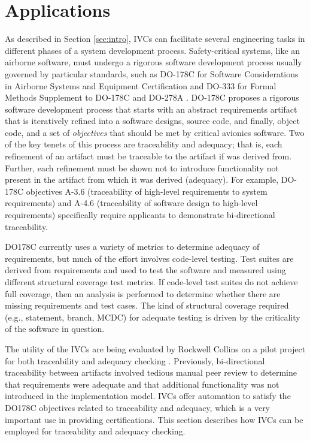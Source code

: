 \section{Applications}
\label{sec:apps}
As described in Section \ref{sec:intro}, IVCs can facilitate several engineering tasks in different phases of a system development process. 
Safety-critical systems, like an airborne software, must undergo a rigorous software development process usually governed by particular standards, such as DO-178C for Software Considerations in Airborne Systems and Equipment Certification \cite{DO178C} and DO-333 for Formal Methods Supplement to DO-178C and DO-278A \cite{DO333}. 
DO-178C proposes a rigorous software development process that starts with an abstract requirements artifact that is iteratively refined into a software designs, source code, and finally, object code, and a set of {\em objectives} that should be met by critical avionics software.  Two of the key tenets of this process are traceability and adequacy; that is, each refinement of an artifact must be traceable to the artifact if was derived from. Further, each refinement must be shown not to introduce functionality not present in the artifact from which it was derived (adequacy). For example, DO-178C objectives A-3.6 (traceability of high-level requirements to system requirements) and A-4.6 (traceability of software design to high-level requirements) specifically require applicants to demonstrate bi-directional traceability.

DO178C currently uses a variety of metrics to determine adequacy of requirements, but much of the effort involves code-level testing.  Test suites are derived from requirements and used to test the software and measured using different structural coverage test metrics.  If code-level test suites do not achieve full coverage, then an analysis is performed to determine whether there are missing requirements and test cases.  The kind of structural coverage required (e.g., statement, branch, MCDC) for adequate testing is driven by the criticality of the software in question.

The utility of the IVCs are being evaluated by Rockwell Collins on a pilot project for both traceability and adequacy checking \cite{lucas17}. Previously, bi-directional traceability between artifacts involved tedious manual peer review to determine that requirements were adequate and that additional functionality was not introduced in the implementation model. IVCs offer automation to satisfy the DO178C objectives related to traceability and adequacy, which is a very important use in providing certifications. This section describes how IVCs can be employed for traceability and adequacy checking.

